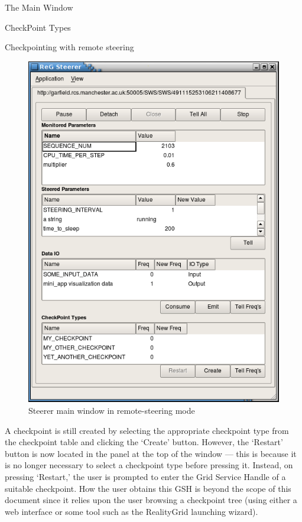 \documentclass[a4paper,twoside]{article}
\begin{document}
\begin{section}{The Main Window}
\begin{subsection}{CheckPoint Types}
\begin{subsubsection}{Checkpointing with remote steering}
\begin{figure}
\centerline{\includegraphics{main_window_grid.png}}
\caption{Steerer main window in remote-steering mode}
\label{fig:main_window_grid}
\end{figure}

A checkpoint is still created by selecting the appropriate checkpoint
type from the checkpoint table and clicking the `Create' button.
However, the `Restart' button is now located in the panel at the top
of the window --- this is because it is no longer necessary to select a
checkpoint type before pressing it.  Instead, on pressing `Restart,'
the user is prompted to enter the Grid Service Handle of a suitable
checkpoint.  How the user obtains this GSH is beyond the scope of this
document since it relies upon the user browsing a checkpoint tree
(using either a web interface or some tool such as the RealityGrid
launching wizard).

\end{subsubsection} %

\end{subsection} %
\end{section} %
\end{document}
